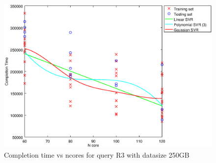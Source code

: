 
\begin {figure}[hbtp]
\centering
\includegraphics[width=\textwidth]{output/R3_250_ONLY_1_LINEAR_NCORE/plot_R3_250_bestmodels.eps}
\caption{Completion time vs ncores for query R3 with datasize 250GB}
\label{fig:only_1_linear_R3_250}
\end {figure}
